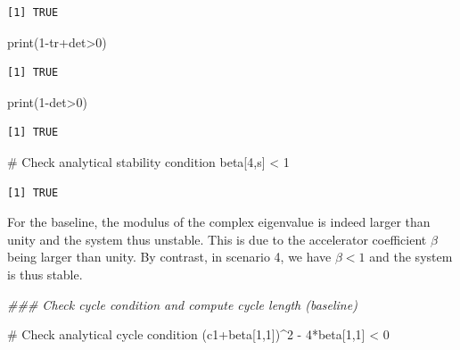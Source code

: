 \documentclass[
  letterpaper,
  DIV=11,
  numbers=noendperiod]{scrreprt}
\newenvironment{Shaded}{\begin{snugshade}}{\end{snugshade}}
\newcommand{\CommentTok}[1]{\textcolor[rgb]{0.37,0.37,0.37}{#1}}
\newcommand{\DecValTok}[1]{\textcolor[rgb]{0.68,0.00,0.00}{#1}}
\newcommand{\DocumentationTok}[1]{\textcolor[rgb]{0.37,0.37,0.37}{\textit{#1}}}
\newcommand{\FunctionTok}[1]{\textcolor[rgb]{0.28,0.35,0.67}{#1}}
\newcommand{\NormalTok}[1]{\textcolor[rgb]{0.00,0.23,0.31}{#1}}
\newcommand{\SpecialCharTok}[1]{\textcolor[rgb]{0.37,0.37,0.37}{#1}}
\begin{document}
\begin{verbatim}
[1] TRUE
\end{verbatim}

\begin{Shaded}
\begin{Highlighting}[]
\FunctionTok{print}\NormalTok{(}\DecValTok{1}\SpecialCharTok{{-}}\NormalTok{tr}\SpecialCharTok{+}\NormalTok{det}\SpecialCharTok{\textgreater{}}\DecValTok{0}\NormalTok{)}
\end{Highlighting}
\end{Shaded}

\begin{verbatim}
[1] TRUE
\end{verbatim}

\begin{Shaded}
\begin{Highlighting}[]
\FunctionTok{print}\NormalTok{(}\DecValTok{1}\SpecialCharTok{{-}}\NormalTok{det}\SpecialCharTok{\textgreater{}}\DecValTok{0}\NormalTok{)}
\end{Highlighting}
\end{Shaded}

\begin{verbatim}
[1] TRUE
\end{verbatim}

\begin{Shaded}
\begin{Highlighting}[]
\CommentTok{\# Check analytical stability condition}
\NormalTok{beta[}\DecValTok{4}\NormalTok{,s] }\SpecialCharTok{\textless{}} \DecValTok{1}
\end{Highlighting}
\end{Shaded}

\begin{verbatim}
[1] TRUE
\end{verbatim}

For the baseline, the modulus of the complex eigenvalue is indeed larger
than unity and the system thus unstable. This is due to the accelerator
coefficient \(\beta\) being larger than unity. By contrast, in scenario
4, we have \(\beta < 1\) and the system is thus stable.

\begin{Shaded}
\begin{Highlighting}[]
\DocumentationTok{\#\#\# Check cycle condition and compute cycle length (baseline)}

\CommentTok{\# Check analytical cycle condition}
\NormalTok{(c1}\SpecialCharTok{+}\NormalTok{beta[}\DecValTok{1}\NormalTok{,}\DecValTok{1}\NormalTok{])}\SpecialCharTok{\^{}}\DecValTok{2} \SpecialCharTok{{-}} \DecValTok{4}\SpecialCharTok{*}\NormalTok{beta[}\DecValTok{1}\NormalTok{,}\DecValTok{1}\NormalTok{] }\SpecialCharTok{\textless{}} \DecValTok{0}
\end{Highlighting}
\end{Shaded}
\end{document}
